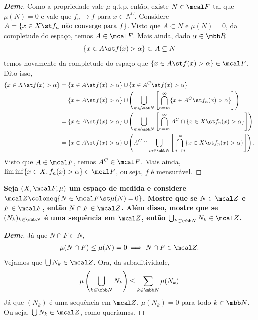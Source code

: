 \begin{proof}[\textbf{Dem:}]Como a propriedade vale $\mu$-q.t.p, então, existe $N \in \mcal F$ tal que $\mu(N) = 0$ e 
  vale que $f_n \rightarrow f$ para $x \in N^C$. Considere $A = \{x \in X\st f_n\text{ não converge para }f\}$. Visto que 
  $A \subset N$ e $\mu(N) = 0$, da completude do espaço, temos $A \in \mcal F$. Mais ainda, dado $\alpha \in \mbb R$
  \begin{align*}
    \{x \in A \st f(x) > \alpha\} \subset A \subseteq N
  \end{align*}
  temos novamente da completude do espaço que $\{x \in A \st f(x)>\alpha\} \in \mcal F$. Dito isso, 
  \begin{align*}
    \{x \in X \st f(x)> \alpha \} &= \{x \in A \st f(x)>\alpha\}\cup \{x \in A^C \st f(x) > \alpha\}\\
    &= \{x \in A \st f(x)>\alpha\}\cup \left(\bigcup\limits_{m \in \mbb N} \left[
      \bigcap\limits_{n = m}^{\infty}\{x \in A^C \st f_n(x) > \alpha\} \right]\right)\\
    &= \{x \in A \st f(x)>\alpha\}\cup \left(\bigcup\limits_{m \in \mbb N} \left[
      \bigcap\limits_{n = m}^{\infty}A^C\cap\{x \in X \st f_n(x) > \alpha\} \right]\right)\\
    &= \{x \in A \st f(x)>\alpha\}\cup \left(A^C \cap \bigcup\limits_{m \in \mbb N} \left[
      \bigcap\limits_{n = m}^{\infty}\{x \in X \st f_n(x) > \alpha\} \right]\right). 
  \end{align*}
  Visto que $A \in \mcal F$, temos $A^C \in \mcal F$. Mais ainda, $\lim \inf \{x \in X; f_n(x)> \alpha\} \in \mcal F$, 
  ou seja, $f$ é mensurável.
\end{proof}
\biglinend
\newpage
{}
\myexe{\thedois}
\bigline 
\textbf{Seja $(X, \mcal F, \mu)$ um espaço de medida e considere $\mcal Z\coloneq \{N \in \mcal F\st \mu(N) = 0\}$. 
Mostre que se $N \in \mcal Z$ e $F \in \mcal F$, então $N \cap F \in \mcal Z$. Além disso, mostre que se 
$(N_k)_{k \in \mbb N}$ é uma sequência em $\mcal Z$, então $\bigcup_{k \in \mbb N} N_k \in \mcal Z$.}
\begin{proof}[\textbf{Dem:}]
 Já que $N \cap F \subset N$, 
  \begin{align*}
    \mu(N \cap F) \le \mu(N) = 0 \implies N\cap F \in \mcal Z. 
  \end{align*}
  Vejamos que $\bigcup N_k \in \mcal Z$. Ora, da subaditividade, 
  \begin{align*}
    \mu\left(\bigcup\limits_{k \in \mbb N} N_k\right) \le \sum_{k \in \mbb N} \mu(N_k)
  \end{align*}
  Já que $(N_k)$ é uma sequência em $\mcal Z$, $\mu(N_k) = 0$ para todo $k \in \mbb N$. Ou seja, 
  $\bigcup N_k \in \mcal Z$, como queríamos.
\end{proof}
